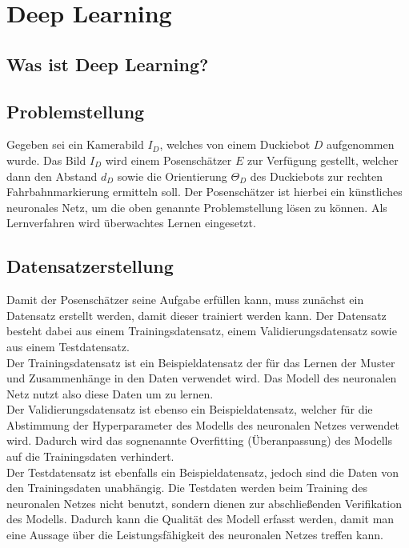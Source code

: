 \chapter{Deep Learning}

\section{Was ist Deep Learning?}

\section{Problemstellung}

Gegeben sei ein Kamerabild $I_D$, welches von einem Duckiebot $D$ aufgenommen wurde. Das Bild $I_D$ wird einem Posenschätzer $E$ zur Verfügung gestellt, welcher dann den Abstand $d_D$ sowie die Orientierung $\Theta_D$ des Duckiebots zur rechten 
Fahrbahnmarkierung ermitteln soll. Der Posenschätzer ist hierbei ein künstliches neuronales Netz, um die oben genannte Problemstellung lösen zu können. Als Lernverfahren wird überwachtes Lernen eingesetzt.

\section{Datensatzerstellung}

Damit der Posenschätzer seine Aufgabe erfüllen kann, muss zunächst ein Datensatz erstellt werden, damit dieser trainiert werden kann. Der Datensatz besteht dabei aus einem Trainingsdatensatz, einem Validierungsdatensatz sowie aus einem Testdatensatz. \\

Der Trainingsdatensatz ist ein Beispieldatensatz der für das Lernen der Muster und Zusammenhänge in den Daten verwendet wird. Das Modell des neuronalen Netz nutzt also diese Daten um zu lernen. \cite{datasolut} \\

Der Validierungsdatensatz ist ebenso ein Beispieldatensatz, welcher für die Abstimmung der Hyperparameter des Modells des neuronalen Netzes verwendet wird. Dadurch wird das sognenannte \glqq Overfitting\grqq{} (Überanpassung) des Modells auf die Trainingsdaten verhindert. \cite{datasolut} \\

Der Testdatensatz ist ebenfalls ein Beispieldatensatz, jedoch sind die Daten von den Trainingsdaten unabhängig. Die Testdaten werden beim Training des neuronalen Netzes nicht benutzt, sondern dienen zur abschließenden Verifikation des Modells. Dadurch kann die Qualität des Modell erfasst werden, damit man eine Aussage über die Leistungsfähigkeit des neuronalen Netzes treffen kann. \cite{datasolut} \\

